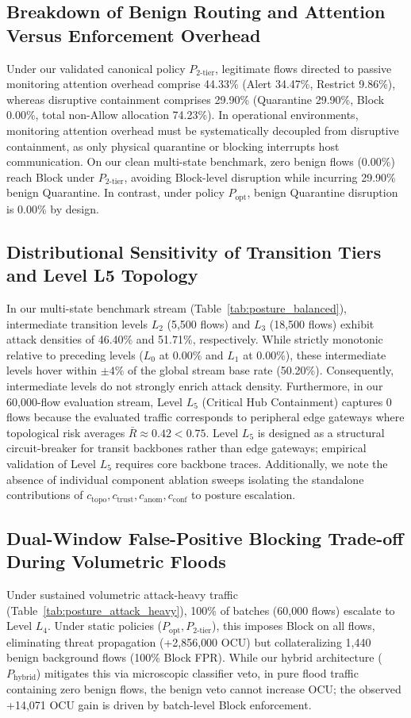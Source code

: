 \documentclass[journal,10pt,onecolumn]{IEEEtran}
\begin{document}
\subsection{Breakdown of Benign Routing and Attention Versus Enforcement Overhead}
Under our validated canonical policy $P_{2\text{-tier}}$, legitimate flows directed to passive monitoring attention overhead comprise 44.33\% (Alert 34.47\%, Restrict 9.86\%), whereas disruptive containment comprises 29.90\% (Quarantine 29.90\%, Block 0.00\%, total non-Allow allocation 74.23\%). In operational environments, monitoring attention overhead must be systematically decoupled from disruptive containment, as only physical quarantine or blocking interrupts host communication. On our clean multi-state benchmark, zero benign flows (0.00\%) reach Block under $P_{2\text{-tier}}$, avoiding Block-level disruption while incurring 29.90\% benign Quarantine. In contrast, under policy $P_{\text{opt}}$, benign Quarantine disruption is 0.00\% by design.

\subsection{Distributional Sensitivity of Transition Tiers and Level L5 Topology}
In our multi-state benchmark stream (Table~\ref{tab:posture_balanced}), intermediate transition levels $L_2$ (5,500 flows) and $L_3$ (18,500 flows) exhibit attack densities of 46.40\% and 51.71\%, respectively. While strictly monotonic relative to preceding levels ($L_0$ at 0.00\% and $L_1$ at 0.00\%), these intermediate levels hover within $\pm 4\%$ of the global stream base rate (50.20\%). Consequently, intermediate levels do not strongly enrich attack density. Furthermore, in our 60,000-flow evaluation stream, Level $L_5$ (Critical Hub Containment) captures 0 flows because the evaluated traffic corresponds to peripheral edge gateways where topological risk averages $\bar{R} \approx 0.42 < 0.75$. Level $L_5$ is designed as a structural circuit-breaker for transit backbones rather than edge gateways; empirical validation of Level $L_5$ requires core backbone traces. Additionally, we note the absence of individual component ablation sweeps isolating the standalone contributions of $c_{\text{topo}}, c_{\text{trust}}, c_{\text{anom}}, c_{\text{conf}}$ to posture escalation.

\subsection{Dual-Window False-Positive Blocking Trade-off During Volumetric Floods}
Under sustained volumetric attack-heavy traffic (Table~\ref{tab:posture_attack_heavy}), 100\% of batches (60,000 flows) escalate to Level $L_4$. Under static policies ($P_{\text{opt}}, P_{2\text{-tier}}$), this imposes Block on all flows, eliminating threat propagation (+2,856,000 OCU) but collateralizing 1,440 benign background flows (100\% Block FPR). While our hybrid architecture ($P_{\text{hybrid}}$) mitigates this via microscopic classifier veto, in pure flood traffic containing zero benign flows, the benign veto cannot increase OCU; the observed +14,071 OCU gain is driven by batch-level Block enforcement.
\end{document}
